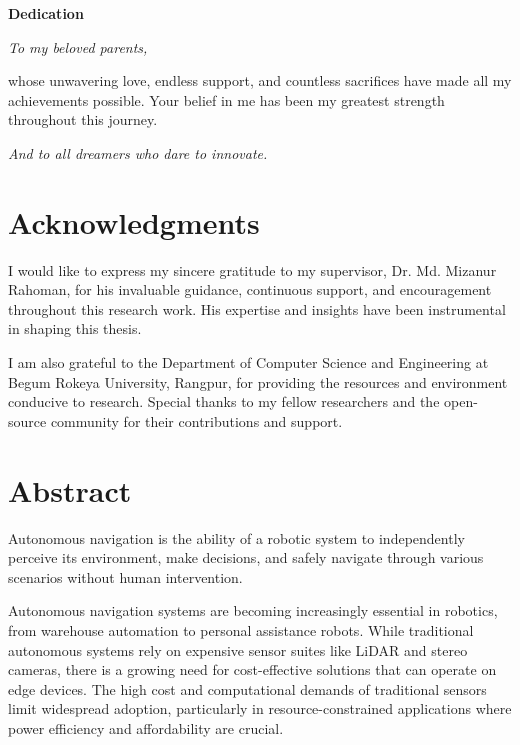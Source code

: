 \documentclass[12pt,oneside]{book}
\newcommand{\thesupervisor}{ Dr. Md. Mizanur Rahoman}
\begin{document}
\newpage
\thispagestyle{empty}
\vspace*{3cm}

\begin{center}
    {\Large \textbf{Dedication}}

    \vspace{2cm}

    \begin{minipage}{0.8\textwidth}
    \large
    \textit{To my beloved parents,}

    \vspace{0.5cm}

    whose unwavering love, endless support, and countless sacrifices have made all my achievements possible. Your belief in me has been my greatest strength throughout this journey.

    \vspace{0.5cm}

    \textit{And to all dreamers who dare to innovate.}
    \end{minipage}
\end{center}
\clearpage

\chapter*{Acknowledgments}
I would like to express my sincere gratitude to my supervisor, \thesupervisor, for his invaluable guidance, continuous support, and encouragement throughout this research work. His expertise and insights have been instrumental in shaping this thesis.

I am also grateful to the Department of Computer Science and Engineering at Begum Rokeya University, Rangpur, for providing the resources and environment conducive to research. Special thanks to my fellow researchers and the open-source community for their contributions and support.

\clearpage

\chapter*{Abstract}
Autonomous navigation is the ability of a robotic system to independently perceive its environment, make decisions, and safely navigate through various scenarios without human intervention.

Autonomous navigation systems are becoming increasingly essential in robotics, from warehouse automation to personal assistance robots. While traditional autonomous systems rely on expensive sensor suites like LiDAR and stereo cameras, there is a growing need for cost-effective solutions that can operate on edge devices. The high cost and computational demands of traditional sensors limit widespread adoption, particularly in resource-constrained applications where power efficiency and affordability are crucial.
\end{document}
